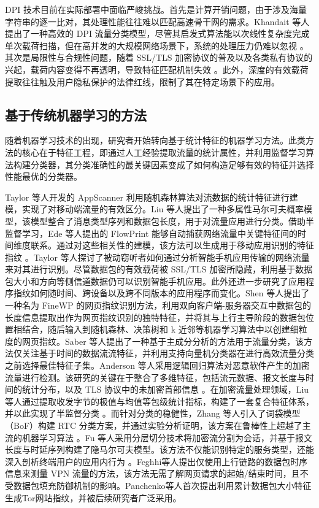 DPI 技术目前在实际部署中面临严峻挑战。首先是计算开销问题，由于涉及海量字符串的逐一比对，其处理性能往往难以匹配高速骨干网的需求。Khandait 等人提出了一种高效的 DPI 流量分类模型，尽管其启发式算法能以次线性复杂度完成单次载荷扫描，但在高并发的大规模网络场景下，系统的处理压力仍难以忽视 \cite{khandait2020efficient}。其次是局限性与合规性问题，随着 SSL/TLS 加密协议的普及以及各类私有协议的兴起，载荷内容变得不再透明，导致特征匹配机制失效 。此外，深度的有效载荷提取往往触及用户隐私保护的法律红线，限制了其在特定场景下的应用\cite{dainotti2012issues}。

\subsection{基于传统机器学习的方法}
随着机器学习技术的出现，研究者开始转向基于统计特征的机器学习方法。此类方法的核心在于特征工程，即通过人工经验提取流量的统计属性，并利用监督学习算法构建分类器，其分类准确性的最关键因素变成了如何构造足够有效的特征并选择性能最优的分类器。

Taylor 等人开发的 AppScanner 利用随机森林算法对流数据的统计特征进行建模，实现了对移动端流量的有效区分\cite{taylor2016appscanner}。Liu 等人提出了一种多属性马尔可夫概率模型，该模型整合了消息类型序列和数据包长度，用于对流量应用进行分类\cite{liu2018mampf}。借助半监督学习，Ede 等人提出的 FlowPrint 能够自动捕获网络流量中关键特征间的时间维度联系。通过对这些相关性的建模，该方法可以生成用于移动应用识别的特征指纹 \cite{van2020flowprint}。Taylor 等人探讨了被动窃听者如何通过分析智能手机应用传输的网络流量来对其进行识别。尽管数据包的有效载荷被 SSL/TLS 加密所隐藏，利用基于数据包大小和方向等侧信道数据仍可以识别智能手机应用。此外还进一步研究了应用程序指纹如何随时间、跨设备以及跨不同版本的应用程序而变化\cite{taylor2017robust}。Shen 等人提出了一种名为 FineWP 的网页指纹识别方法，利用双向客户端-服务器交互中数据包的长度信息提取出作为网页指纹识别的独特特征，并将其与上行主导阶段的数据包位置相结合，随后输入到随机森林、决策树和 k 近邻等机器学习算法中以创建细粒度的网页指纹\cite{shen2020fine}。Saber 等人提出了一种基于主成分分析的方法用于流量分类，该方法仅关注基于时间的数据流流特征，并利用支持向量机分类器在进行高效流量分类之前选择最佳特征子集\cite{saber2018encrypted}。Anderson 等人采用逻辑回归算法对恶意软件产生的加密流量进行检测。该研究的关键在于整合了多维特征，包括流元数据、报文长度与时间的统计分布，以及 TLS 协议中的未加密首部信息 \cite{anderson2018deciphering}。在加密流量处理领域，Liu 等人通过提取收发字节的极值与均值等包级统计指标，构建了一套复合特征体系，并以此实现了半监督分类 \cite{liu2012semi}。而针对分类的稳健性，Zhang 等人引入了词袋模型（BoF）构建 RTC 分类方案，并通过实验分析证明，该方案在鲁棒性上超越了主流的机器学习算法 \cite{zhang2014robust}。Fu 等人采用分层切分技术将加密流分割为会话，并基于报文长度与时延序列构建了隐马尔可夫模型。该方法不仅能识别特定的服务类型，还能深入剖析终端用户的应用内行为 \cite{fu2016service}。Feghhi等人提出仅使用上行链路的数据包时序信息来测量 VPN 流量的方法，该方法无需了解网页请求的起始/结束时间，且不受数据包填充防御机制的影响\cite{feghhi2016web}。Panchenko等人首次提出利用累计数据包大小特征生成Tor网站指纹，并被后续研究者广泛采用\cite{panchenko2016website}。

